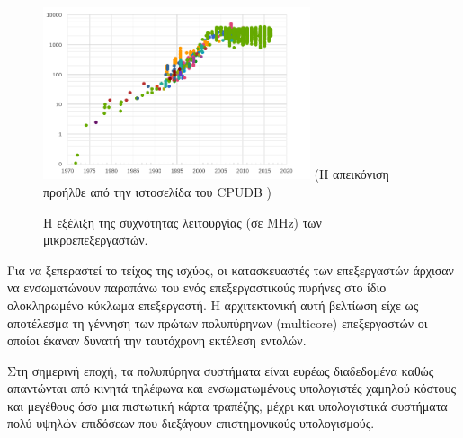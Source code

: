 \begin{figure}[t]
	\centering
	\includegraphics[width=0.7\textwidth]{Figures/cpudb.png}
	\linebreak 
	{\small (Η απεικόνιση προήλθε από την ιστοσελίδα του CPUDB \cite{danowitz2012cpu})}
	\caption{Η εξέλιξη της συχνότητας λειτουργίας (σε MHz) των μικροεπεξεργαστών.}
	\label{fig:CPUDB}
\end{figure}


Για να ξεπεραστεί το τείχος της ισχύος, οι κατασκευαστές των επεξεργαστών άρχισαν να ενσωματώνουν παραπάνω του ενός επεξεργαστικούς πυρήνες στο ίδιο ολοκληρωμένο κύκλωμα επεξεργαστή. Η αρχιτεκτονική αυτή βελτίωση είχε ως αποτέλεσμα τη γέννηση των πρώτων πολυπύρηνων (multicore) επεξεργαστών οι οποίοι έκαναν δυνατή την ταυτόχρονη εκτέλεση εντολών.

Στη σημερινή εποχή, τα πολυπύρηνα συστήματα είναι ευρέως διαδεδομένα καθώς απαντώνται από κινητά τηλέφωνα και ενσωματωμένους υπολογιστές χαμηλού κόστους και μεγέθους όσο μια πιστωτική κάρτα τραπέζης, μέχρι και υπολογιστικά συστήματα πολύ υψηλών επιδόσεων που διεξάγουν επιστημονικούς υπολογισμούς.


